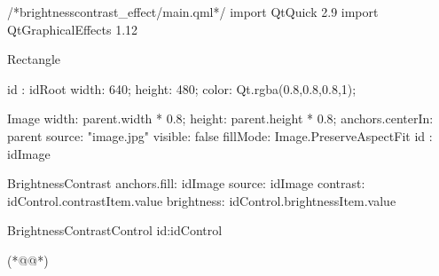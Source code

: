 \label{f000053}    %
\FloatBarrier                                  %
\begin{thebookfilesourceone}[escapeinside={(*@}{@*)},
caption=GoodLuck,
title=\filesourcenumbernameone \thefilesourcenumber
]
/*brightnesscontrast_effect/main.qml*/
import QtQuick 2.9
import QtGraphicalEffects 1.12

Rectangle {

    id : idRoot
    width: 640;
    height: 480;
    color: Qt.rgba(0.8,0.8,0.8,1);


    Image{
        width: parent.width * 0.8;
        height: parent.height * 0.8;
        anchors.centerIn: parent
        source: "image.jpg"
        visible: false
        fillMode: Image.PreserveAspectFit
        id : idImage
    }

    BrightnessContrast{
        anchors.fill: idImage
        source: idImage
        contrast: idControl.contrastItem.value
        brightness: idControl.brightnessItem.value
    }

    BrightnessContrastControl{
        id:idControl
    }

}(*@\marginpar[\hfill\setlength\fboxsep{2pt}\fbox{\footnotesize{\kaishu\parbox{1em}{\setlength{\baselineskip}{2pt}\filesourcenumbernameone}}\footnotesize{\thefilesourcenumber}}]{\setlength\fboxsep{2pt}\fbox{\footnotesize{\kaishu\parbox{1em}{\setlength{\baselineskip}{2pt}\filesourcenumbernameone}}\footnotesize{\thefilesourcenumber}}}@*)\end{thebookfilesourceone}          %
\addtocounter{lstlisting}{-1}   %













